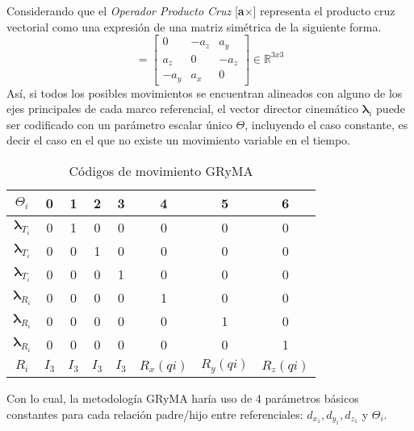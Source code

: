         Considerando que el \emph{Operador Producto Cruz} 
        [\textbf{a}$\times$] representa el producto cruz vectorial como una expresión 
        de una matriz simétrica de la siguiente forma.
        \begin{equation*}
            [\mathbf{a}\times] = 
            \begin{bmatrix}
                0 & -a_z & a_y\\
                a_z & 0 & -a_z\\
                -a_y & a_x & 0
            \end{bmatrix}
            \in \mathbb{R}^{3x3}
        \end{equation*}
        Así, si todos los posibles movimientos se encuentran alineados con alguno de los 
        ejes principales de cada marco referencial, el vector director cinemático $\boldsymbol{\lambda}_i$ 
        puede ser codificado con un parámetro escalar único $\Theta$, incluyendo el caso constante, 
        es decir el caso en el que no existe un movimiento variable en el tiempo.
        \begin{table}[H]
            \caption{Códigos de movimiento GRyMA}
            \centering
                \begin{center}
                    \begin{tabular}{cccccccc}
                        $\Theta_i$ & 0 & 1 & 2 & 3 & 4 & 5 & 6\\
                        \hline \hline 
                        $\boldsymbol{\lambda}_{T_i}$ & 0 & 1 & 0 & 0 & 0 & 0 & 0\\ 
                        $\boldsymbol{\lambda}_{T_i}$ & 0 & 0 & 1 & 0 & 0 & 0 & 0\\
                        $\boldsymbol{\lambda}_{T_i}$ & 0 & 0 & 0 & 1 & 0 & 0 & 0\\
                        \hline 
                        $\boldsymbol{\lambda}_{R_i}$ & 0 & 0 & 0 & 0 & 1 & 0 & 0\\
                        $\boldsymbol{\lambda}_{R_i}$ & 0 & 0 & 0 & 0 & 0 & 1 & 0\\
                        $\boldsymbol{\lambda}_{R_i}$ & 0 & 0 & 0 & 0 & 0 & 0 & 1\\
                        \hline 
                        $R_{i}$ & $I_3$ & $I_3$ & $I_3$ & $I_3$ & $R_{x}(qi)$ & $R_{y}(qi)$ & $R_{z}(qi)$\\
                    \end{tabular}
                \end{center}   
        \end{table}
        Con lo cual, la metodología GRyMA haría uso de 4 parámetros básicos constantes 
        para cada relación padre/hijo entre referenciales: $d_{x_1}, d_{y_1}, d_{z_1}$ 
        y $\Theta_i$.

